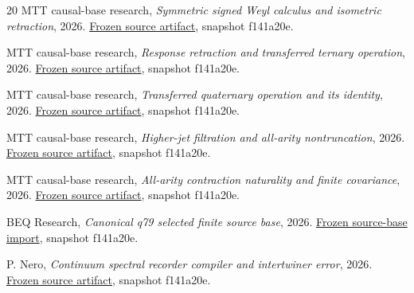 \documentclass[11pt]{article}
\begin{document}
\begin{thebibliography}{20}
MTT causal-base research, \emph{Symmetric signed Weyl calculus and isometric retraction}, 2026.
\href{https://github.com/PeterNero/mtt-results-repro/blob/f141a20ea23c5c3ff19cc2161c0e226e29ade8a7/release/results/causal_base_q79_symmetric_weyl_calculus_isometric_retraction_packet/artifact.json}{Frozen source artifact}, snapshot f141a20e.

MTT causal-base research, \emph{Response retraction and transferred ternary operation}, 2026.
\href{https://github.com/PeterNero/mtt-results-repro/blob/f141a20ea23c5c3ff19cc2161c0e226e29ade8a7/release/results/causal_base_q79_symmetric_response_retraction_transferred_m3_packet/artifact.json}{Frozen source artifact}, snapshot f141a20e.

MTT causal-base research, \emph{Transferred quaternary operation and its identity}, 2026.
\href{https://github.com/PeterNero/mtt-results-repro/blob/f141a20ea23c5c3ff19cc2161c0e226e29ade8a7/release/results/causal_base_q79_symmetric_response_transferred_m4_packet/artifact.json}{Frozen source artifact}, snapshot f141a20e.

MTT causal-base research, \emph{Higher-jet filtration and all-arity nontruncation}, 2026.
\href{https://github.com/PeterNero/mtt-results-repro/blob/f141a20ea23c5c3ff19cc2161c0e226e29ade8a7/release/results/causal_base_q79_higher_transfer_jet_filtration_and_m5_feasibility_packet/artifact.json}{Frozen source artifact}, snapshot f141a20e.

MTT causal-base research, \emph{All-arity contraction naturality and finite covariance}, 2026.
\href{https://github.com/PeterNero/mtt-results-repro/blob/f141a20ea23c5c3ff19cc2161c0e226e29ade8a7/release/results/causal_base_q79_all_arity_source_promotion_packet/artifact.json}{Frozen source artifact}, snapshot f141a20e.

BEQ Research, \emph{Canonical q79 selected finite source base}, 2026.
\href{https://github.com/PeterNero/mtt-results-repro/blob/f141a20ea23c5c3ff19cc2161c0e226e29ade8a7/release/results/beq_q79_fmo_q79_selected_source_base/artifact.json}{Frozen source-base import}, snapshot f141a20e.

P. Nero, \emph{Continuum spectral recorder compiler and intertwiner error}, 2026.
\href{https://github.com/PeterNero/mtt-results-repro/blob/f141a20ea23c5c3ff19cc2161c0e226e29ade8a7/release/results/q79_continuum_recorder_compiler/artifact.json}{Frozen source artifact}, snapshot f141a20e.


\end{thebibliography}
\end{document}
